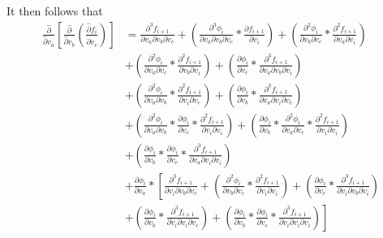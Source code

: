 \documentclass[12pt,letter]{article}
\begin{document}
	It then follows that
	\begin{equation}
	\begin{split}
	\frac{\hat{\partial}}{\hat{\partial}  v_a}\left[\frac{\hat{\partial}}{\hat{\partial} v_b}\left(\frac{\hat{\partial} f_i}{\hat{\partial} v_c}\right)\right]
	&= 
	\frac{\partial^3 f_{i+1}}{\partial v_a \partial v_b \partial v_c} + 
	\left(\frac{\partial^3 \phi_i}{\partial v_a \partial v_b \partial v_c} * \frac{\partial f_{i+1}}{\partial v_i}\right) + 
	\left(\frac{\partial^2 \phi_i}{\partial v_b \partial v_c} * \frac{\partial^2 f_{i+1}}{\partial v_a \partial v_i}\right) 
	\\
	&+
	\left(\frac{\partial^2 \phi_i}{\partial v_a \partial v_c} * \frac{\partial^2 f_{i+1}}{\partial v_b \partial v_i}\right) + 
	\left(\frac{\partial \phi_i}{\partial v_c} * \frac{\partial^3 f_{i+1}}{\partial v_a \partial v_b \partial v_i}\right) 
	\\
	&+
	\left(\frac{\partial^2 \phi_i}{\partial v_a \partial v_b} * \frac{\partial^2 f_{i+1}}{\partial v_i \partial v_c}\right) + 
	\left(\frac{\partial \phi_i}{\partial v_b} * \frac{\partial^3 f_{i+1}}{\partial v_a \partial v_i \partial v_c}\right) 
	\\
	&+
	\left(\frac{\partial^2 \phi_i}{\partial v_a \partial v_b} * \frac{\partial \phi_i}{\partial v_c} * \frac{\partial^2 f_{i+1}}{\partial v_i \partial v_i}\right) + 
	\left(\frac{\partial \phi_i}{\partial v_b} * \frac{\partial^2 \phi_i}{\partial v_a \partial v_c} * \frac{\partial^2 f_{i+1}}{\partial v_i \partial v_i}\right) 
	\\
	&+
	\left(\frac{\partial \phi_i}{\partial v_b} * \frac{\partial \phi_i}{\partial v_c} * \frac{\partial^3 f_{i+1}}{\partial v_a \partial v_i \partial v_i}\right) 
	\\
	&+
	\frac{\partial \phi_i}{\partial v_a} * 
	\left[\frac{\partial^3 f_{i+1}}{\partial v_i \partial v_b \partial v_c} + 
	\left(\frac{\partial^2 \phi_i}{\partial v_b \partial v_c} * \frac{\partial^2 f_{i+1}}{\partial v_i \partial v_i}\right) + 
	\left(\frac{\partial \phi_i}{\partial v_c} * \frac{\partial^3 f_{i+1}}{\partial v_i \partial v_b \partial v_i}\right) 
	\right.
	\\
	&
	\left.
	+ \left(\frac{\partial \phi_i}{\partial v_b} * \frac{\partial^3 f_{i+1}}{\partial v_i \partial v_i \partial v_c}\right) + 
	\left(\frac{\partial \phi_i}{\partial v_b} * \frac{\partial \phi_i}{\partial v_c} * \frac{\partial^3 f_{i+1}}{\partial v_i \partial v_i \partial v_i}\right)\right]
	\end{split}
	\end{equation}
	
\end{document}
